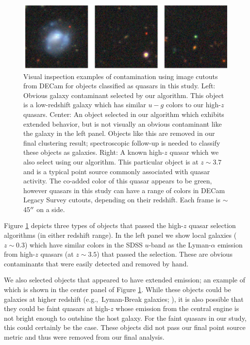 \documentclass[apj, numberedappendix]{emulateapj}
\begin{document}
\begin{figure}[h!]
\includegraphics[scale = 0.5]{./New_Plots/contam_examples_good.png}
\centering
\caption{\footnotesize{Visual inspection examples of contamination using image cutouts from DECam for objects classified as quasars in this study. Left: Obvious galaxy contaminant selected by our algorithm. This object is a low-redshift galaxy which has similar $u-g$ colors to our high-$z$ quasars. Center: An object selected in our algorithm which exhibits extended behavior, but is not visually an obvious contaminant like the galaxy in the left panel. Objects like this are removed in our final clustering result; spectroscopic follow-up is needed to classify these objects as galaxies. Right: A known high-$z$ quasar which we also select using our algorithm. This particular object is at $z \sim 3.7$ and is a typical point source commonly associated with quasar activity. The co-added color of this quasar appears to be green, however quasars in this study can have a range of colors in DECam Legacy Survey cutouts, depending on their redshift. Each frame is $\sim$ 45$\mbox{$^{\prime\prime}$}$ on a side.}}\label{fig:contampics}
\end{figure}

Figure \ref{fig:contampics} depicts three types of objects that passed the high-$z$ quasar selection algorithms (in either redshift range). In the left panel we show local galaxies ($z\sim 0.3$) which have similar colors in the SDSS $u$-band as the Lyman-$\alpha$ emission from high-$z$ quasars (at $z\sim 3.5$) that passed the selection. These are obvious contaminants that were easily detected and removed by hand. 

We also selected objects that appeared to have extended emission; an example of which is shown in the center panel of Figure \ref{fig:contampics}. While these objects could be galaxies at higher redshift (e.g.,\ Lyman-Break galaxies; \citealt{He2017}), it is also possible that they could be faint quasars at high-$z$ whose emission from the central engine is not bright enough to outshine the host galaxy. For the faint quasars in our study, this could certainly be the case. These objects did not pass our final point source metric and thus were removed from our final analysis.%
\end{document}
